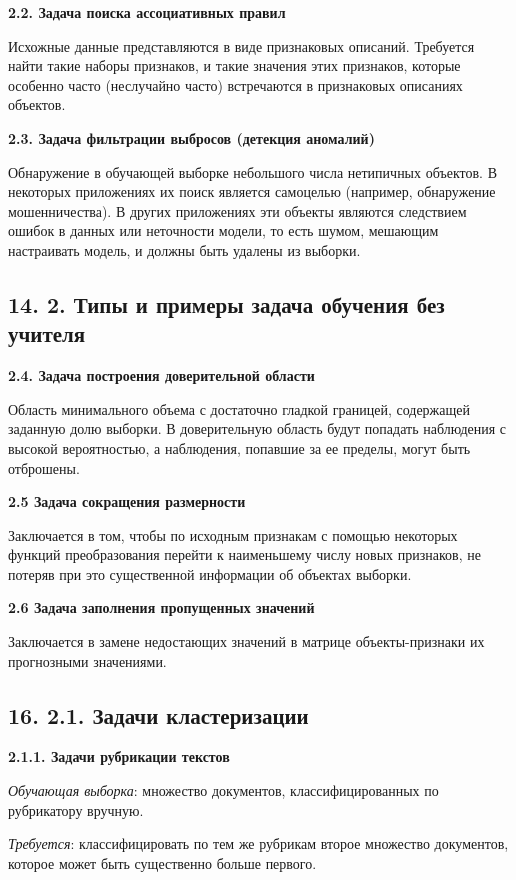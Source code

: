 \textbf{2.2. Задача поиска ассоциативных правил}

Исхожные данные представляются в виде признаковых описаний.
Требуется найти такие наборы признаков, и такие значения этих признаков,
которые особенно часто (неслучайно часто) встречаются в признаковых
описаниях объектов.

\textbf{2.3. Задача фильтрации выбросов (детекция аномалий)}

Обнаружение в обучающей выборке небольшого числа нетипичных объектов.
В некоторых приложениях их поиск является самоцелью (например, обнаружение
мошенничества). В других приложениях эти объекты являются следствием ошибок
в данных или неточности модели, то есть шумом, мешающим настраивать модель,
и должны быть удалены из выборки.

\subsection{14. 2. Типы и примеры задача обучения без учителя}

\textbf{2.4. Задача построения доверительной области}

Область минимального объема с достаточно гладкой границей, содержащей
заданную долю выборки. В доверительную область будут попадать наблюдения с
высокой вероятностью, а наблюдения, попавшие за ее пределы, могут быть
отброшены.

\textbf{2.5 Задача сокращения размерности}

Заключается в том, чтобы по исходным признакам с помощью некоторых функций
преобразования перейти к наименьшему числу новых признаков, не потеряв при
это существенной информации об объектах выборки.

\textbf{2.6 Задача заполнения пропущенных значений}

Заключается в замене недостающих значений в матрице объекты-признаки их
прогнозными значениями.

\subsection{16. 2.1. Задачи кластеризации}

\textbf{2.1.1. Задачи рубрикации текстов}

\textit{Обучающая выборка}: множество документов, классифицированных по рубрикатору
вручную.

\textit{Требуется}: классифицировать по тем же рубрикам второе множество
документов, которое может быть существенно больше первого.

